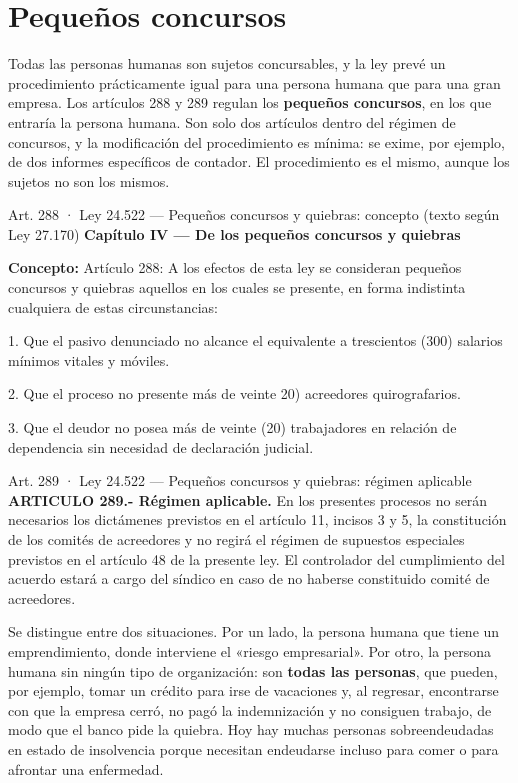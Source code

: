 \documentclass[12pt,oneside]{book}
\begin{document}
\section{Pequeños concursos}

Todas las personas humanas son sujetos concursables, y la ley prevé un procedimiento prácticamente igual para una persona humana que para una gran empresa. Los artículos 288 y 289 regulan los \textbf{pequeños concursos}, en los que entraría la persona humana. Son solo dos artículos dentro del régimen de concursos, y la modificación del procedimiento es mínima: se exime, por ejemplo, de dos informes específicos de contador. El procedimiento es el mismo, aunque los sujetos no son los mismos.

\begin{norma}{Art. 288 · Ley 24.522 — Pequeños concursos y quiebras: concepto (texto según Ley 27.170)}
\textbf{Capítulo IV — De los pequeños concursos y quiebras}

\textbf{Concepto:} Artículo 288: A los efectos de esta ley se consideran pequeños concursos y quiebras aquellos en los cuales se presente, en forma indistinta cualquiera de estas circunstancias:

1. Que el pasivo denunciado no alcance el equivalente a trescientos (300) salarios mínimos vitales y móviles.

2. Que el proceso no presente más de veinte 20) acreedores quirografarios.

3. Que el deudor no posea más de veinte (20) trabajadores en relación de dependencia sin necesidad de declaración judicial.
\end{norma}

\begin{norma}{Art. 289 · Ley 24.522 — Pequeños concursos y quiebras: régimen aplicable}
\textbf{ARTICULO 289.- Régimen aplicable.} En los presentes procesos no serán necesarios los dictámenes previstos en el artículo 11, incisos 3 y 5, la constitución de los comités de acreedores y no regirá el régimen de supuestos especiales previstos en el artículo 48 de la presente ley. El controlador del cumplimiento del acuerdo estará a cargo del síndico en caso de no haberse constituido comité de acreedores.
\end{norma}

Se distingue entre dos situaciones. Por un lado, la persona humana que tiene un emprendimiento, donde interviene el «riesgo empresarial». Por otro, la persona humana sin ningún tipo de organización: son \textbf{todas las personas}, que pueden, por ejemplo, tomar un crédito para irse de vacaciones y, al regresar, encontrarse con que la empresa cerró, no pagó la indemnización y no consiguen trabajo, de modo que el banco pide la quiebra. Hoy hay muchas personas sobreendeudadas en estado de insolvencia porque necesitan endeudarse incluso para comer o para afrontar una enfermedad.
\end{document}
